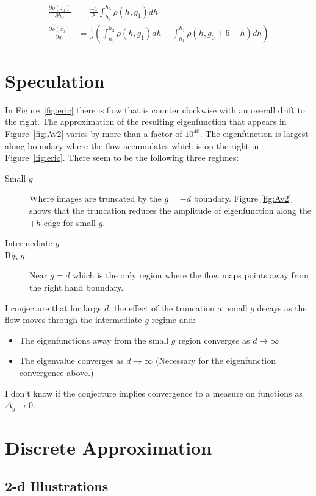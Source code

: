 \documentclass[twocolumn]{article}
\newcommand{\partialtwo}[2]{ \frac{\partial #1}{\partial
      #2}}
\begin{document}
\begin{align*}
  \partialtwo{\rho(z_0)}{h_0} &= \frac{-1}{\lambda} \int_{h_1}^{h_3}
  \rho(h, g_1) dh \\
  \partialtwo{\rho(z_0)}{g_0} &= \frac{1}{\lambda} \left(
    \int_{h_1}^{h_3} \rho(h, g_1) dh
    - \int_{h_1}^{h_2} \rho(h, g_0 + 6 -h ) dh \right)
\end{align*}

\section{Speculation}
\label{sec:speculation}

In Figure~\ref{fig:eric} there is flow that is counter clockwise with
an overall drift to the right.  The approximation of the resulting
eigenfunction that appears in Figure~\ref{fig:Av2} varies by more than
a factor of $10^{40}$.  The eigenfunction is largest along boundary
where the flow accumulates which is on the right in
Figure~\ref{fig:eric}.  There seem to be the following three regimes:
\begin{description}
\item[Small $g$] Where images are truncated by the $g=-d$ boundary.
  Figure \ref{fig:Av2} shows that the truncation reduces the amplitude
  of eigenfunction along the $+h$ edge for small $g$.
\item[Intermediate $g$]
\item[Big $g$:] Near $g=d$ which is the only region where the flow
  maps points away from the right hand boundary.
\
\end{description}
I conjecture that for large $d$, the effect of the truncation at small
$g$ decays as the flow moves through the intermediate $g$ regime and:
\begin{itemize}
\item The eigenfunctions away from the small $g$ region converges as
  $d\rightarrow \infty$
\item The eigenvalue converges as $d\rightarrow \infty$ (Necessary for
  the eigenfunction convergence above.)
\end{itemize}
I don't know if the conjecture implies convergence to a measure on
functions as $\Delta_y \rightarrow 0$.

\section{Discrete Approximation}
\label{sec:approximate}

\subsection{2-d Illustrations}
\label{sec:ill}
\end{document}
